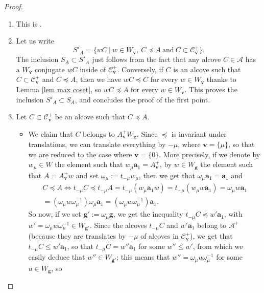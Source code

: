 \documentclass[11pt]{amsart}
\theoremstyle{plain}
\theoremstyle{remark}
\numberwithin{equation}{section}
\begin{document}
	\begin{proof}
		\begin{enumerate}
			\item This is \cite[Proposition 4.22]{Soergel1997KazhdanLusztigPA}.
			\item Let us write
			$$S'_A=\{wC~|~w\in W_\mathbf{v},~C\preceq A~\text{and}~ C\subset \mathscr{C}^+_\mathbf{v}\}. $$
			The inclusion $S_A\subset S'_A$ just follows from the fact that any alcove $C\in\mathcal{A}$ has a $W_{\mathbf{v}}$ conjugate $wC$ inside of $\mathscr{C}^+_{\mathbf{v}}$. Conversely, if $C$ is an alcove such that $C\subset\mathscr{C}^+_{\mathbf{v}}$ and $C\preceq A$, then we have $wC\preceq C$ for every $w\in W_{\mathbf{v}}$ thanks to Lemma \ref{lem max coset}, so $wC\preceq A$ for every $w\in W_{\mathbf{v}}$. This proves the inclusion $S'_A\subset S_A$, and concludes the proof of the first point.
			\item Let $C\subset\mathscr{C}^+_{\mathbf{v}}$ be an alcove such that $C\preceq A$.\begin{itemize}
				\item We claim that $C$ belongs to $A^+_{\mathbf{v}}W_\mathbf{g}$. Since $\preceq$ is invariant under translations, we can translate everything by $-\mu$, where $\mathbf{v}=\{\mu\}$, so that we are reduced to the case where $\mathbf{v}=\{0\}$. More precisely, if we denote by $w_\mu\in W$ the element such that $w_\mu\mathbf{a}_1=A^+_\mathbf{v}$, by $w\in W_\mathbf{g}$ the element such that $A=A^+_\mathbf{v}w$ and set $\omega_\mu:=t_{-\mu}w_\mu$, then we get that $\omega_\mu\mathbf{a}_1=\mathbf{a}_1$ and
				\begin{multline*}C\preceq A\Longleftrightarrow t_{-\mu}C\preceq t_{-\mu}A=t_{-\mu}(w_\mu\mathbf{a}_1w)=t_{-\mu}(w_\mu w\mathbf{a}_1)= \omega_\mu w\mathbf{a}_1\\=(\omega_\mu w\omega_\mu^{-1})\omega_\mu\mathbf{a}_1=(\omega_\mu w\omega_\mu^{-1})\mathbf{a}_1.  \end{multline*}
			 So now, if we set $\mathbf{g}':=\omega_\mu\mathbf{g}$, we get the inequality $t_{-\mu}C\preceq w'\mathbf{a}_1$, with $w'=\omega_\mu w\omega_\mu^{-1}\in W_{\mathbf{g}'}$. Since the alcoves $t_{-\mu}C$ and $w'\mathbf{a}_1$ belong to $\mathcal{A}^+$ (because they are translates by $-\mu$ of alcoves in $\mathscr{C}^+_\mathbf{v}$), we get that $t_{-\mu}C\leq w'\mathbf{a}_1$, so that $t_{-\mu}C=w''\mathbf{a}_1$ for some $w''\leq w'$, from which we easily deduce that $w''\in W_{\mathbf{g}'}$; this means that $w''=\omega_\mu u\omega_\mu^{-1}$ for some $u\in W_\mathbf{g}$, so 

\end{itemize}
\end{enumerate}
\end{proof}
\end{document}
